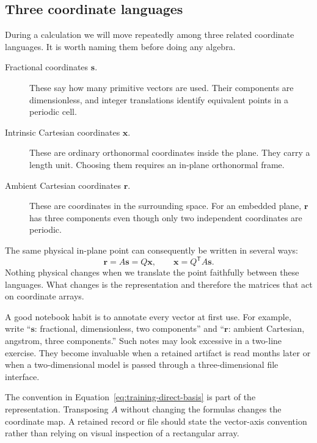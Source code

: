 \subsection{Three coordinate languages}

During a calculation we will move repeatedly among three related coordinate
languages. It is worth naming them before doing any algebra.

\begin{description}
  \item[Fractional coordinates $\mathbf s$.]
    These say how many primitive vectors are used. Their components are
    dimensionless, and integer translations identify equivalent points in a
    periodic cell.
  \item[Intrinsic Cartesian coordinates $\mathbf x$.]
    These are ordinary orthonormal coordinates inside the plane. They carry a
    length unit. Choosing them requires an in-plane orthonormal frame.
  \item[Ambient Cartesian coordinates $\mathbf r$.]
    These are coordinates in the surrounding space. For an embedded plane,
    $\mathbf r$ has three components even though only two independent
    coordinates are periodic.
\end{description}

The same physical in-plane point can consequently be written in several ways:
\begin{equation}
  \mathbf r=A\mathbf s=Q\mathbf x,
  \qquad
  \mathbf x=Q^{\mathsf T}A\mathbf s.
  \label{eq:training-three-coordinate-languages}
\end{equation}
Nothing physical changes when we translate the point faithfully between these
languages. What changes is the representation and therefore the matrices that
act on coordinate arrays.

A good notebook habit is to annotate every vector at first use. For example,
write ``$\mathbf s$: fractional, dimensionless, two components'' and
``$\mathbf r$: ambient Cartesian, angstrom, three components.'' Such notes may
look excessive in a two-line exercise. They become invaluable when a retained
artifact is read months later or when a two-dimensional model is passed through
a three-dimensional file interface.

\begin{remark}
The convention in Equation~\eqref{eq:training-direct-basis} is part of the
representation. Transposing $A$ without changing the formulas changes the
coordinate map. A retained record or file should state the vector-axis
convention rather than relying on visual inspection of a rectangular array.
\end{remark}

